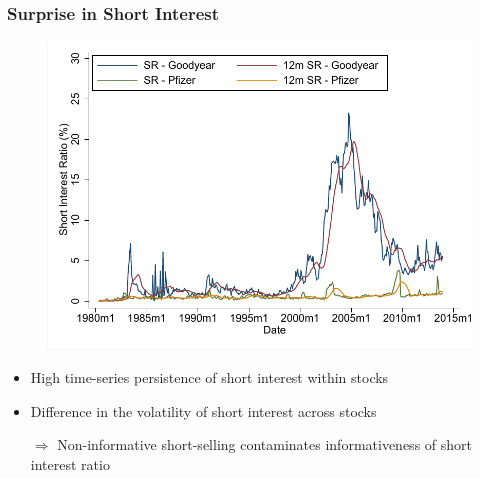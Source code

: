 \documentclass{beamer}
\begin{document}
\begin{frame}
		\frametitle{Surprise in Short Interest}
\begin{figure}[htbp]
	 \centering
	 \vspace*{-0.3cm}
	\includegraphics[scale=0.6,trim=4 4 4 4,clip]{figures/intro_graph.pdf} 
	\label{tab:cumLS}%
\end{figure}
\vspace*{-0.4cm}
	\begin{itemize}
\item High time-series persistence of short interest within stocks
\item Difference in the volatility of short interest across stocks

\item[$\Rightarrow$] Non-informative short-selling contaminates informativeness of short interest ratio
	\end{itemize}
\end{frame}

\end{document}
